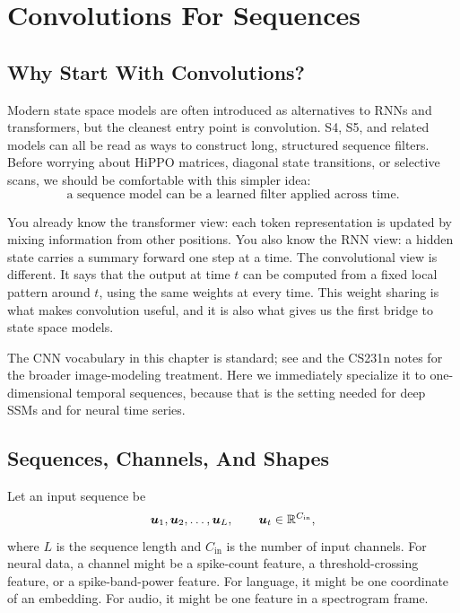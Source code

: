 \chapter{Convolutions For Sequences}
\label{ch:convolutions-for-sequences}

\section{Why Start With Convolutions?}

Modern state space models are often introduced as alternatives to RNNs and transformers,
but the cleanest entry point is convolution. S4, S5, and related models can all be read as
ways to construct long, structured sequence filters. Before worrying about HiPPO matrices,
diagonal state transitions, or selective scans, we should be comfortable with this simpler
idea:
\[
  \text{a sequence model can be a learned filter applied across time.}
\]

You already know the transformer view: each token representation is updated by mixing
information from other positions. You also know the RNN view: a hidden state carries a
summary forward one step at a time. The convolutional view is different. It says that the
output at time $t$ can be computed from a fixed local pattern around $t$, using the same
weights at every time. This weight sharing is what makes convolution useful, and it is
also what gives us the first bridge to state space models.

The CNN vocabulary in this chapter is standard; see \citet{goodfellow2016deep} and the
CS231n notes \citep{cs231n} for the broader image-modeling treatment. Here we immediately
specialize it to one-dimensional temporal sequences, because that is the setting needed
for deep SSMs and for neural time series.

\section{Sequences, Channels, And Shapes}

Let an input sequence be
\[
  \bm{u}_1,\bm{u}_2,\ldots,\bm{u}_L,
  \qquad
  \bm{u}_t \in \mathbb{R}^{C_{\mathrm{in}}},
\]
where $L$ is the sequence length and $C_{\mathrm{in}}$ is the number of input channels.
For neural data, a channel might be a spike-count feature, a threshold-crossing feature,
or a spike-band-power feature. For language, it might be one coordinate of an embedding.
For audio, it might be one feature in a spectrogram frame.

